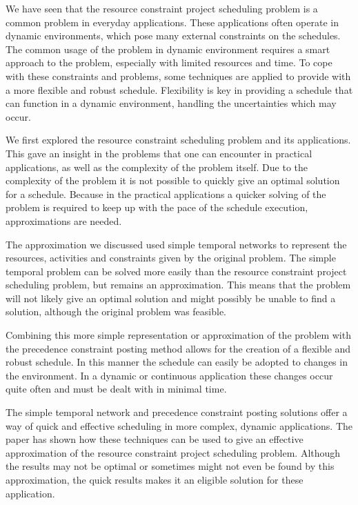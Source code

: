 \documentclass{article}
\theoremstyle{definition}
\begin{document}
We have seen that the resource constraint project scheduling problem is a common problem in everyday applications.
These applications often operate in dynamic environments, which pose many external constraints on the schedules.
The common usage of the problem in dynamic environment requires a smart approach to the problem, especially with limited resources and time.
To cope with these constraints and problems, some techniques are applied to provide with a more flexible and robust schedule.
Flexibility is key in providing a schedule that can function in a dynamic environment, handling the uncertainties which may occur.

We first explored the resource constraint scheduling problem and its applications.
This gave an insight in the problems that one can encounter in practical applications, as well as the complexity of the problem itself.
Due to the complexity of the problem it is not possible to quickly give an optimal solution for a schedule.
Because in the practical applications a quicker solving of the problem is required to keep up with the pace of the schedule execution, approximations are needed.

The approximation we discussed used simple temporal networks to represent the resources, activities and constraints given by the original problem.
The simple temporal problem can be solved more easily than the resource constraint project scheduling problem, but remains an approximation.
This means that the problem will not likely give an optimal solution and might possibly be unable to find a solution, although the original problem was feasible.

Combining this more simple representation or approximation of the problem with the precedence constraint posting method allows for the creation of a flexible and robust schedule.
In this manner the schedule can easily be adopted to changes in the environment.
In a dynamic or continuous application these changes occur quite often and must be dealt with in minimal time.

The simple temporal network and precedence constraint posting solutions offer a way of quick and effective scheduling in more complex, dynamic applications.
The paper has shown how these techniques can be used to give an effective approximation of the resource constraint project scheduling problem.
Although the results may not be optimal or sometimes might not even be found by this approximation, the quick results makes it an eligible solution for these application.

\newpage


\end{document}
